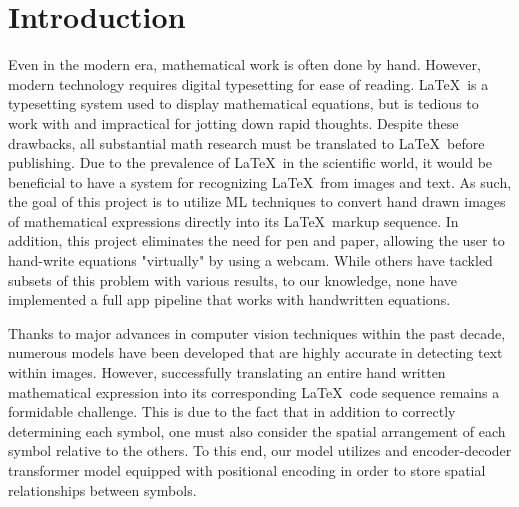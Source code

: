 \section{Introduction}
\label{sec:intro}
Even in the modern era, mathematical work is often done by hand. However, modern technology requires digital typesetting for ease of reading. \LaTeX\ is a typesetting system used to display mathematical equations, but is tedious to work with and impractical for jotting down rapid thoughts. Despite these drawbacks, all substantial math research must be translated to \LaTeX\ before publishing. Due to the prevalence of \LaTeX\ in the scientific world, it would be beneficial to have a system for recognizing \LaTeX\ from images and text. As such, the goal of this project is to utilize ML techniques to convert hand drawn images of mathematical expressions directly into its \LaTeX\ markup sequence. In addition, this project eliminates the need for pen and paper, allowing the user to hand-write equations "virtually" by using a webcam. While others have tackled subsets of this problem with various results\cite{Peng2021, Genthial2016, Wang2019, Wang2021}, to our knowledge, none have implemented a full app pipeline that works with handwritten equations.


Thanks to major advances in computer vision techniques within the past decade, numerous models have been developed that are highly accurate in detecting text within images. However, successfully translating an entire hand written mathematical expression into its corresponding \LaTeX\ code sequence remains a formidable challenge. This is due to the fact that in addition to correctly determining each symbol, one must also consider the spatial arrangement of each symbol relative to the others. To this end, our model utilizes and encoder-decoder transformer model equipped with positional encoding in order to store spatial relationships between symbols. 


